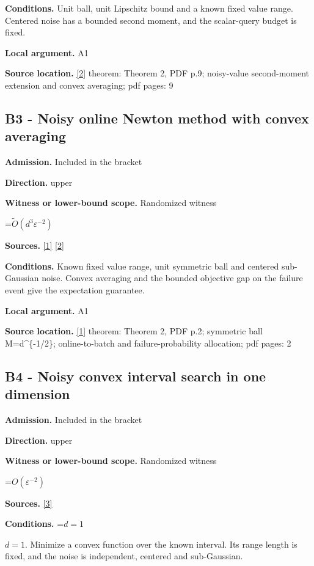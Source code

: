 \documentclass[10pt,a4paper]{article}
\newcommand{\AtlasMath}[1]{\par\begingroup\centering\setbox0=\hbox{$\displaystyle #1$}\ifdim\wd0>1.4\linewidth\typeout{ATLAS WIDE FORMULA: \the\wd0}\fi\ifdim\wd0>\linewidth\resizebox{\linewidth}{!}{\box0}\else\box0\fi\par\endgroup}
\newcommand{\AtlasInlineMath}[1]{\begingroup\setbox0=\hbox{$#1$}\ifdim\wd0>.4\linewidth\endgroup\AtlasMath{#1}\else\endgroup$#1$\fi}
\begin{document}
\textbf{Conditions.} Unit ball, unit Lipschitz bound and a known fixed value range. Centered noise has a bounded second moment, and the scalar-query budget is fixed.

\textbf{Local argument.} A1

\textbf{Source location.} \href{https://arxiv.org/abs/cs/0408007}{[2]} theorem: Theorem 2, PDF p.9; noisy-value second-moment extension and convex averaging; pdf pages: 9

\subsection{B3 - Noisy online Newton method with convex averaging}
\textbf{Admission.} Included in the bracket

\textbf{Direction.} upper

\textbf{Witness or lower-bound scope.} Randomized witness

\AtlasMath{\widetilde{O}(d^3\varepsilon^{-2})}
\textbf{Sources.} \href{https://arxiv.org/pdf/2406.06506}{[1]} \href{https://arxiv.org/abs/cs/0408007}{[2]}

\textbf{Conditions.} Known fixed value range, unit symmetric ball and centered sub-Gaussian noise. Convex averaging and the bounded objective gap on the failure event give the expectation guarantee.

\textbf{Local argument.} A1

\textbf{Source location.} \href{https://arxiv.org/pdf/2406.06506}{[1]} theorem: Theorem 2, PDF p.2; symmetric ball M=d\textasciicircum{}\{-1/2\}; online-to-batch and failure-probability allocation; pdf pages: 2

\subsection{B4 - Noisy convex interval search in one dimension}
\textbf{Admission.} Included in the bracket

\textbf{Direction.} upper

\textbf{Witness or lower-bound scope.} Randomized witness

\AtlasMath{O(\varepsilon^{-2})}
\textbf{Sources.} \href{https://arxiv.org/html/2607.12938v1}{[3]}

\textbf{Conditions.} \AtlasInlineMath{d=1}. Minimize a convex function over the known interval. Its range length is fixed, and the noise is independent, centered and sub-Gaussian.
\end{document}
